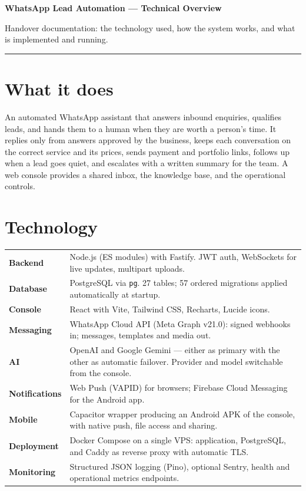 \documentclass[10pt,a4paper]{article}
\begin{document}
{\LARGE\bfseries WhatsApp Lead Automation --- Technical Overview}

\vspace{3pt}
{\small Handover documentation: the technology used, how the system works, and
what is implemented and running.}

\vspace{4pt}
\hrule

\section{What it does}

An automated WhatsApp assistant that answers inbound enquiries, qualifies
leads, and hands them to a human when they are worth a person's time. It
replies only from answers approved by the business, keeps each conversation on
the correct service and its prices, sends payment and portfolio links, follows
up when a lead goes quiet, and escalates with a written summary for the team. A
web console provides a shared inbox, the knowledge base, and the operational
controls.

\section{Technology}

{\small
\begin{tabularx}{\textwidth}{@{}p{30mm}X@{}}
\textbf{Backend} & Node.js (ES modules) with Fastify. JWT auth, WebSockets for
live updates, multipart uploads. \\
\textbf{Database} & PostgreSQL via \texttt{pg}. 27 tables; 57 ordered
migrations applied automatically at startup. \\
\textbf{Console} & React with Vite, Tailwind CSS, Recharts, Lucide icons. \\
\textbf{Messaging} & WhatsApp Cloud API (Meta Graph v21.0): signed webhooks in;
messages, templates and media out. \\
\textbf{AI} & OpenAI and Google Gemini --- either as primary with the other as
automatic failover. Provider and model switchable from the console. \\
\textbf{Notifications} & Web Push (VAPID) for browsers; Firebase Cloud
Messaging for the Android app. \\
\textbf{Mobile} & Capacitor wrapper producing an Android APK of the console,
with native push, file access and sharing. \\
\textbf{Deployment} & Docker Compose on a single VPS: application, PostgreSQL,
and Caddy as reverse proxy with automatic TLS. \\
\textbf{Monitoring} & Structured JSON logging (Pino), optional Sentry, health
and operational metrics endpoints. \\
\end{tabularx}
}
\end{document}
